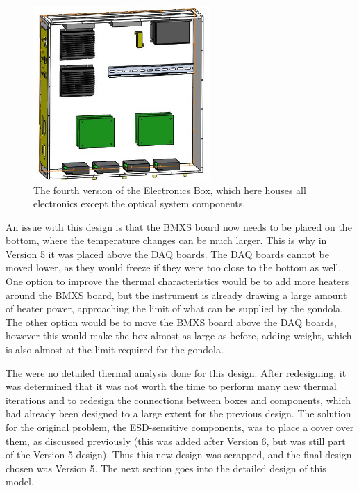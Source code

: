 \begin{figure}
    \centering
    \includegraphics[width=0.6\textwidth]{chap3_images/LIFE_V6_images/EBOX_V4.JPG}
    \caption{The fourth version of the Electronics Box, which here houses all electronics except the optical system components.}
    \label{fig:EBOX_V4}
\end{figure}

An issue with this design is that the BMXS board now needs to be placed on the bottom, where the temperature changes can be much larger. This is why in Version 5 it was placed above the DAQ boards. The DAQ boards cannot be moved lower, as they would freeze if they were too close to the bottom as well. One option to improve the thermal characteristics would be to add more heaters around the BMXS board, but the instrument is already drawing a large amount of heater power, approaching the limit of what can be supplied by the gondola. The other option would be to move the BMXS board above the DAQ boards, however this would make the box almost as large as before, adding weight, which is also almost at the limit required for the gondola.

The were no detailed thermal analysis done for this design. After redesigning, it was determined that it was not worth the time to perform many new thermal iterations and to redesign the connections between boxes and components, which had already been designed to a large extent for the previous design. The solution for the original problem, the ESD-sensitive components, was to place a cover over them, as discussed previously (this was added after Version 6, but was still part of the Version 5 design). Thus this new design was scrapped, and the final design chosen was Version 5. The next section goes into the detailed design of this model.

